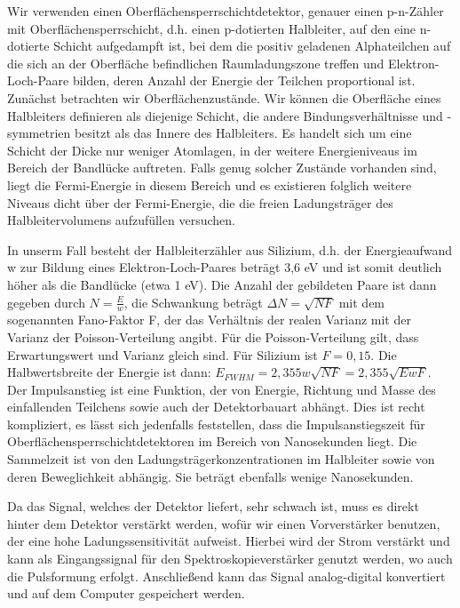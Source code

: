 \documentclass[bigchapter,colorback,accentcolor=tud4b,linedtoc,11pt]{tudreport}
\begin{document}
Wir verwenden einen Oberflächensperrschichtdetektor, genauer einen p-n-Zähler mit Oberflächensperrschicht, d.h. einen p-dotierten Halbleiter, auf den eine n-dotierte Schicht aufgedampft ist, bei dem die positiv geladenen Alphateilchen auf die sich an der Oberfläche befindlichen Raumladungszone treffen und Elektron-Loch-Paare bilden, deren Anzahl der Energie der Teilchen proportional ist. Zunächst betrachten wir Oberflächenzustände. Wir können die Oberfläche eines Halbleiters definieren als diejenige Schicht, die andere Bindungsverhältnisse und -symmetrien besitzt als das Innere des Halbleiters. Es handelt sich um eine Schicht der Dicke nur weniger Atomlagen, in der weitere Energieniveaus im Bereich der Bandlücke auftreten. Falls genug solcher Zustände vorhanden sind, liegt die Fermi-Energie in diesem Bereich und es existieren folglich weitere Niveaus dicht über der Fermi-Energie, die die freien Ladungsträger des Halbleitervolumens aufzufüllen versuchen. 

In unserm Fall besteht der Halbleiterzähler aus Silizium, d.h. der Energieaufwand w zur Bildung eines Elektron-Loch-Paares beträgt 3,6 eV und ist somit deutlich höher als die Bandlücke (etwa 1 eV). Die Anzahl der gebildeten Paare ist dann gegeben durch $N = \frac{E}{w}$, die Schwankung beträgt $\Delta N = \sqrt{N F}$ mit dem sogenannten Fano-Faktor F, der das Verhältnis der realen Varianz mit der Varianz der Poisson-Verteilung angibt. Für die Poisson-Verteilung gilt, dass Erwartungswert und Varianz gleich sind. Für Silizium ist $F = 0,15$. Die Halbwertsbreite der Energie ist dann: $E_{FWHM} = 2,355 w \sqrt{N F} = 2,355 \sqrt{E w F}$.
Der Impulsanstieg ist eine Funktion, der von Energie, Richtung und Masse des einfallenden Teilchens sowie auch der Detektorbauart abhängt. Dies ist recht kompliziert, es lässt sich jedenfalls feststellen, dass die Impulsanstiegszeit für Oberflächensperrschichtdetektoren im Bereich von Nanosekunden liegt. Die Sammelzeit ist von den Ladungsträgerkonzentrationen im Halbleiter sowie von deren Beweglichkeit abhängig. Sie beträgt ebenfalls wenige Nanosekunden.

Da das Signal, welches der Detektor liefert, sehr schwach ist, muss es direkt hinter dem Detektor verstärkt werden, wofür wir einen Vorverstärker benutzen, der eine hohe Ladungssensitivität aufweist. Hierbei wird der Strom verstärkt und kann als Eingangssignal für den Spektroskopieverstärker genutzt werden, wo auch die Pulsformung erfolgt. Anschließend kann das Signal analog-digital konvertiert und auf dem Computer gespeichert werden. 
\end{document}
